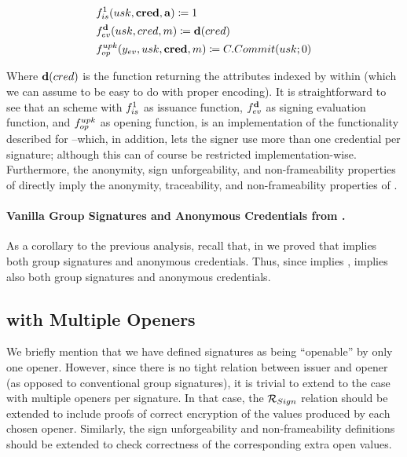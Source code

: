 \begin{align}
  & f_{is}^1(usk,\mathbf{cred},\mathbf{a}) \coloneqq 1 \nonumber \\
  & f_{ev}^{\mathbf{d}}(usk,cred,m) \coloneqq \mathbf{d}(cred) \nonumber \\
  & f_{op}^{upk}(y_{ev},usk,\mathbf{cred},m) \coloneqq C.Commit(usk;0)
    \label{eq:uas-gsac-funcs}
\end{align}

Where $\mathbf{d}(cred)$ is the function returning the attributes indexed by
\dattrs within \cred (which we can assume to be easy to do with proper
encoding). It is straightforward to see that an \UAS scheme with $f_{is}^1$
as issuance function, $f_{ev}^{\mathbf{d}}$ as signing evaluation function, and
$f_{op}^{upk}$ as opening function, is an implementation of the functionality
described for \GSAC --which, in addition, lets the signer use more than one
credential per signature; although this can of course be restricted
implementation-wise.
%
Furthermore, the anonymity, sign unforgeability, and non-frameability properties
of \UAS directly imply the anonymity, traceability, and non-frameability
properties of \GSAC.

\paragraph{Vanilla Group Signatures and Anonymous Credentials from \UAS.} As a
corollary to the previous analysis, recall that, in 
we proved that \GSAC implies both group signatures and anonymous credentials.
Thus, since \UAS implies \GSAC, \UAS implies also both group signatures and
anonymous credentials.

\subsection{\UAS with Multiple Openers}
\label{ssec:uas-multiopen}

We briefly mention that we have defined \UAS signatures as being ``openable'' by
only one opener. However, since there is no tight relation between issuer and
opener (as opposed to conventional group signatures), it is trivial to
extend to the case with multiple openers per signature. In that case, the
$\mathcal{R}_{Sign}$ relation should be extended to include proofs of correct
encryption of the \yinsp values produced by each chosen opener.
Similarly, the sign unforgeability and non-frameability definitions should be
extended to check correctness of the corresponding extra open values.

